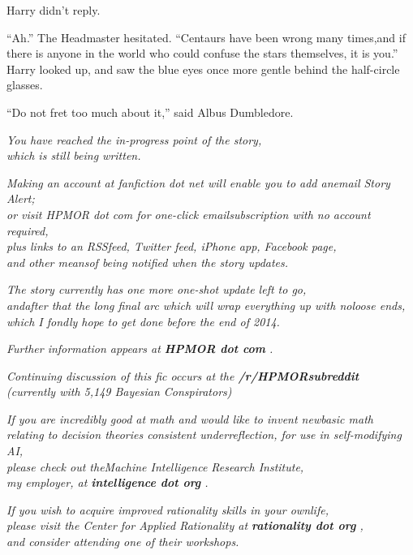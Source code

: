 Harry didn't reply.

“Ah.” The Headmaster hesitated. “Centaurs have been wrong many times,and if there is anyone in the world who could confuse the stars themselves, it is you.”
Harry looked up, and saw the blue eyes once more gentle behind the half-circle glasses.

“Do not fret too much about it,” said Albus Dumbledore.

\replacement{\sbreak}{}

\emph{You have reached the in-progress point of the story,}\\
\emph{which is still being written.}

\emph{Making an account at fanfiction dot net will enable you to add anemail Story Alert;}\\ \emph{or visit HPMOR dot com for one-click emailsubscription with no account required,}\\ \emph{plus links to an RSSfeed, Twitter feed, iPhone app, Facebook page,}\\ \emph{and other meansof being notified when the story updates.}

\emph{The story currently has one more one-shot update left to go,\\ andafter that the long final arc which will wrap everything up with noloose ends,\\ which I fondly hope to get done before the end of 2014.}

\emph{Further information appears at \textbf{HPMOR dot com} .}

\emph{Continuing discussion of this fic occurs at the \textbf{/r/HPMORsubreddit}}\\ \emph{(currently with 5,149 Bayesian Conspirators)}

\emph{If you are incredibly good at math and would like to invent newbasic math}\\ \emph{relating to decision theories consistent underreflection, for use in self-modifying AI,}\\ \emph{please check out theMachine Intelligence Research Institute,}\\ \emph{my employer, at
\textbf{intelligence dot org} .}

\emph{If you wish to acquire improved rationality skills in your ownlife,}\\ \emph{please visit the Center for Applied Rationality at
\textbf{rationality dot org} ,}\\ \emph{and consider attending one of their workshops.}

